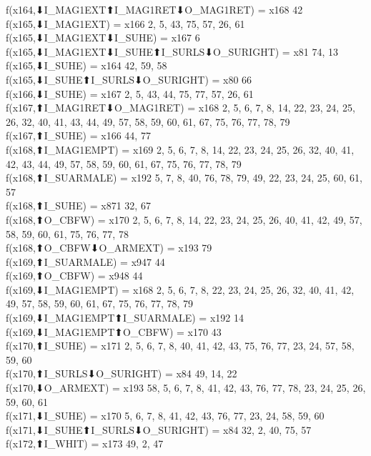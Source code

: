 f(x164,⬇I_MAG1EXT⬆I_MAG1RET⬇O_MAG1RET) = x168 {42} \\
f(x165,⬇I_MAG1EXT) = x166 {2, 5, 43, 75, 57, 26, 61} \\
f(x165,⬇I_MAG1EXT⬇I_SUHE) = x167 {6} \\
f(x165,⬇I_MAG1EXT⬇I_SUHE⬆I_SURLS⬇O_SURIGHT) = x81 {74, 13} \\
f(x165,⬇I_SUHE) = x164 {42, 59, 58} \\
f(x165,⬇I_SUHE⬆I_SURLS⬇O_SURIGHT) = x80 {66} \\
f(x166,⬇I_SUHE) = x167 {2, 5, 43, 44, 75, 77, 57, 26, 61} \\
f(x167,⬆I_MAG1RET⬇O_MAG1RET) = x168 {2, 5, 6, 7, 8, 14, 22, 23, 24, 25, 26, 32, 40, 41, 43, 44, 49, 57, 58, 59, 60, 61, 67, 75, 76, 77, 78, 79} \\
f(x167,⬆I_SUHE) = x166 {44, 77} \\
f(x168,⬆I_MAG1EMPT) = x169 {2, 5, 6, 7, 8, 14, 22, 23, 24, 25, 26, 32, 40, 41, 42, 43, 44, 49, 57, 58, 59, 60, 61, 67, 75, 76, 77, 78, 79} \\
f(x168,⬆I_SUARMALE) = x192 {5, 7, 8, 40, 76, 78, 79, 49, 22, 23, 24, 25, 60, 61, 57} \\
f(x168,⬆I_SUHE) = x871 {32, 67} \\
f(x168,⬆O_CBFW) = x170 {2, 5, 6, 7, 8, 14, 22, 23, 24, 25, 26, 40, 41, 42, 49, 57, 58, 59, 60, 61, 75, 76, 77, 78} \\
f(x168,⬆O_CBFW⬇O_ARMEXT) = x193 {79} \\
f(x169,⬆I_SUARMALE) = x947 {44} \\
f(x169,⬆O_CBFW) = x948 {44} \\
f(x169,⬇I_MAG1EMPT) = x168 {2, 5, 6, 7, 8, 22, 23, 24, 25, 26, 32, 40, 41, 42, 49, 57, 58, 59, 60, 61, 67, 75, 76, 77, 78, 79} \\
f(x169,⬇I_MAG1EMPT⬆I_SUARMALE) = x192 {14} \\
f(x169,⬇I_MAG1EMPT⬆O_CBFW) = x170 {43} \\
f(x170,⬆I_SUHE) = x171 {2, 5, 6, 7, 8, 40, 41, 42, 43, 75, 76, 77, 23, 24, 57, 58, 59, 60} \\
f(x170,⬆I_SURLS⬇O_SURIGHT) = x84 {49, 14, 22} \\
f(x170,⬇O_ARMEXT) = x193 {58, 5, 6, 7, 8, 41, 42, 43, 76, 77, 78, 23, 24, 25, 26, 59, 60, 61} \\
f(x171,⬇I_SUHE) = x170 {5, 6, 7, 8, 41, 42, 43, 76, 77, 23, 24, 58, 59, 60} \\
f(x171,⬇I_SUHE⬆I_SURLS⬇O_SURIGHT) = x84 {32, 2, 40, 75, 57} \\
f(x172,⬆I_WHIT) = x173 {49, 2, 47} \\
